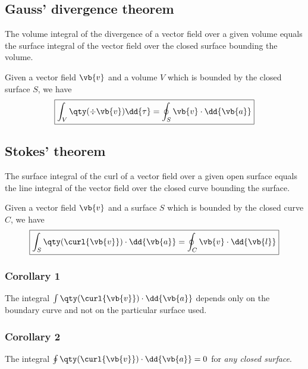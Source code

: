 	\subsection{Gauss' divergence theorem}
		The volume integral of the divergence of a vector field over a given volume equals the surface integral of the vector field over the closed surface bounding the volume.
		
		Given a vector field $\vb{v}$ and a volume $V$ which is bounded by the closed surface $S$, we have
		\begin{align*}
			\boxed{\int_{V}{\qty(\div{\vb{v}})\dd{\tau}}=\oint_{S}{\vb{v}\cdot\dd{\vb{a}}}}
		\end{align*}
	
		
	\subsection{Stokes' theorem}
		The surface integral of the curl of a vector field over a given open surface equals the line integral of the vector field over the closed curve bounding the surface.
		
		Given a vector field $\vb{v}$ and a surface $S$ which is bounded by the closed curve $C$, we have	
		\begin{align*}
			\boxed{ \int_{S}{\qty(\curl{\vb{v}})\cdot\dd{\vb{a}}}=\oint_{C}{\vb{v}\cdot\dd{\vb{l}}} }
		\end{align*}
		
		\subsubsection*{Corollary 1}
			The integral $\int{\qty(\curl{\vb{v}})\cdot\dd{\vb{a}}}$ depends only on the boundary curve and not on the particular surface used.
		
		\subsubsection*{Corollary 2}
			The integral $\oint{\qty(\curl{\vb{v}})\cdot\dd{\vb{a}}}=0$ for \emph{any closed surface}.
	
		
